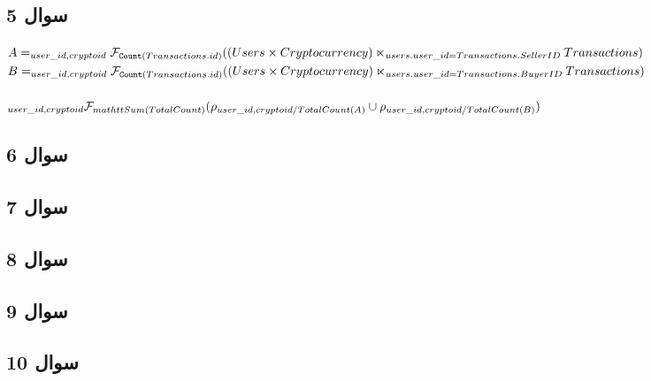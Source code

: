 \documentclass{book}
\begin{document}
        \subsection{سوال 5}

        $A = _{user\_id, cryptoid} \mathcal{F}_{\mathtt{Count}(Transactions.id)}(\\(Users \times Cryptocurrency) \ltimes_{users.user\_id = Transactions.SellerID} \\Transactions)$\\

        $B = _{user\_id, cryptoid} \mathcal{F}_{\mathtt{Count}(Transactions.id)}(\\(Users \times Cryptocurrency) \ltimes_{users.user\_id = Transactions.BuyerID}\\ Transactions)$\\
        \quad\\
        $_{user\_id, cryptoid} \mathcal{F}_{mathtt{Sum}(TotalCount)} (\\\rho_{user\_id, cryptoid/ TotalCount(A)} \cup \rho_{user\_id, cryptoid/ TotalCount(B)} )$

        \subsection{سوال 6}


        \subsection{سوال 7}


        \subsection{سوال 8}


        \subsection{سوال 9}


        \subsection{سوال 10}
\end{document}
